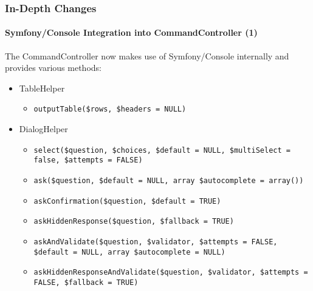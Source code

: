 %

\begin{frame}[fragile]
	\frametitle{In-Depth Changes}
	\framesubtitle{Symfony/Console Integration into CommandController (1)}

	\lstset{basicstyle=\tiny\ttfamily}

	The CommandController now makes use of Symfony/Console internally and provides various
	methods:

	\begin{itemize}

		\item \smaller TableHelper
			\begin{itemize}
				\item\smaller\texttt{outputTable(\$rows, \$headers = NULL)}
			\end{itemize}

		\item DialogHelper
			\begin{itemize}
				\item\smaller\texttt{select(\$question, \$choices, \$default = NULL, \$multiSelect = false, \$attempts = FALSE)}
				\item\texttt{ask(\$question, \$default = NULL, array \$autocomplete = array())}
				\item\texttt{askConfirmation(\$question, \$default = TRUE)}
				\item\texttt{askHiddenResponse(\$question, \$fallback = TRUE)}
				\item\texttt{askAndValidate(\$question, \$validator, \$attempts = FALSE, \$default = NULL, array \$autocomplete = NULL)}
				\item\texttt{askHiddenResponseAndValidate(\$question, \$validator, \$attempts = FALSE, \$fallback = TRUE)}
			\end{itemize}

	\end{itemize}

\end{frame}

